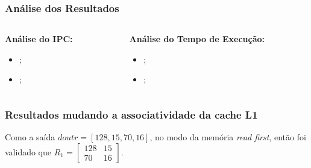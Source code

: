 \documentclass{beamer}
\begin{document}
    \begin{frame}
        \frametitle{Análise dos Resultados}

        \begin{columns}
            \begin{column}{0.5\textwidth}
                \begin{center}
                    \large
                    \textbf{Análise do IPC:}
                \end{center}
                \begin{itemize}
                    \item ;
                    \item ;
                \end{itemize}
            \end{column}

            \begin{column}{0.5\textwidth}
                \begin{center}
                    \large
                    \textbf{Análise do Tempo de Execução:}
                \end{center}
                \begin{itemize}
                    \item ;
                    \item ;
                \end{itemize}
            \end{column}
        \end{columns}

    \end{frame}

    \begin{frame}
        \frametitle{Resultados mudando a associatividade da cache L1}

        \begingroup
            Como a saída $ doutr = [128, 15, 70, 16] $, 
            no modo da memória \textit{read first}, então
            foi validado que $ R_1 = \begin{bmatrix} 128 & 15 \\ 70 & 16 \end{bmatrix} $.
        \endgroup

        \begin{figure}[h]
            \centering
          \end{figure}
    \end{frame}
\end{document}
